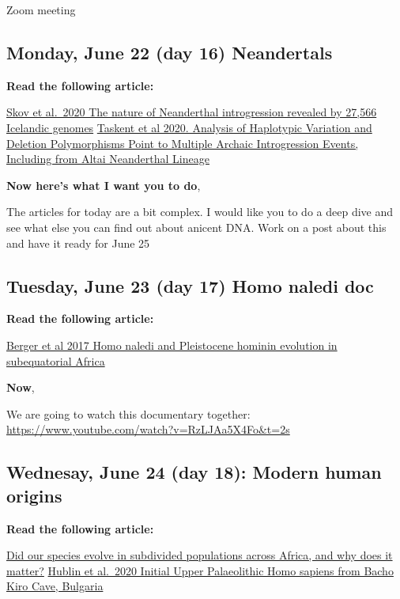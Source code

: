 \documentclass[]{tufte-handout}
\begin{document}
Zoom meeting

\hypertarget{monday-june-22-day-16-neandertals}{%
\subsection{Monday, June 22 (day 16)
Neandertals}\label{monday-june-22-day-16-neandertals}}

\textbf{Read the following article:}

\href{https://www.nature.com/articles/s41586-020-2225-9}{Skov et
al.~2020 The nature of Neanderthal introgression revealed by 27,566
Icelandic genomes}
\href{https://www.genetics.org/content/genetics/early/2020/03/31/genetics.120.303167.full.pdf}{Taskent
et al 2020. Analysis of Haplotypic Variation and Deletion Polymorphisms
Point to Multiple Archaic Introgression Events, Including from Altai
Neanderthal Lineage}

\textbf{Now here's what I want you to do},

The articles for today are a bit complex. I would like you to do a deep
dive and see what else you can find out about anicent DNA. Work on a
post about this and have it ready for June 25

\hypertarget{tuesday-june-23-day-17-homo-naledi-doc}{%
\subsection{Tuesday, June 23 (day 17) Homo naledi
doc}\label{tuesday-june-23-day-17-homo-naledi-doc}}

\textbf{Read the following article:}

\href{https://elifesciences.org/articles/24234}{Berger et al 2017 Homo
naledi and Pleistocene hominin evolution in subequatorial Africa}

\textbf{Now},

We are going to watch this documentary together:
\url{https://www.youtube.com/watch?v=RzLJAa5X4Fo\&t=2s}

\hypertarget{wednesay-june-24-day-18-modern-human-origins}{%
\subsection{Wednesay, June 24 (day 18): Modern human
origins}\label{wednesay-june-24-day-18-modern-human-origins}}

\textbf{Read the following article:}

\href{https://s3.amazonaws.com/academia.edu.documents/59246893/GalwayStringerH.sapScience201820190514-60551-5lp1g2.pdf}{Did
our species evolve in subdivided populations across Africa, and why does
it matter?}
\href{https://www.nature.com/articles/s41586-020-2259-z}{Hublin et
al.~2020 Initial Upper Palaeolithic Homo sapiens from Bacho Kiro Cave,
Bulgaria}
\end{document}
